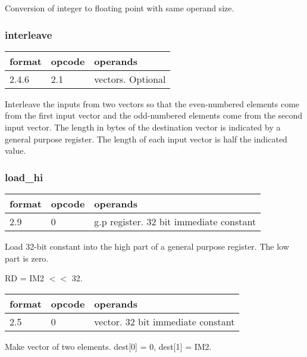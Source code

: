 \documentclass[forwardcom.tex]{subfiles}
\begin{document}
Conversion of integer to floating point with same operand size.

\subsubsection{interleave}
\label{table:interleaveInstruction}
\begin{tabular}{|p{12mm}|p{12mm}|p{110mm}|}
\hline
\bfseries format & \bfseries opcode & \bfseries operands \\ \hline
2.4.6 & 2.1 & vectors. Optional \\ \hline
\end{tabular}
\vspace{2mm}

Interleave the inputs from two vectors so that the even-numbered elements come from the first input vector and the odd-numbered elements come from the second input vector. The length in bytes of the destination vector is indicated by a general purpose register. The length of each input vector is half the indicated value.

\subsubsection{load\_hi}
\label{table:loadHiInstruction}
\begin{tabular}{|p{12mm}|p{12mm}|p{110mm}|}
\hline
\bfseries format & \bfseries opcode & \bfseries operands \\ \hline
2.9 & 0 & g.p register. 32 bit immediate constant \\ \hline
\end{tabular}
\vspace{2mm}

Load 32-bit constant into the high part of a general purpose register. The low part is zero.

RD = IM2 $<<$ 32.
\vspace{4mm}

\begin{tabular}{|p{12mm}|p{12mm}|p{110mm}|}
\hline
\bfseries format & \bfseries opcode & \bfseries operands \\ \hline
2.5 & 0 & vector. 32 bit immediate constant \\ \hline
\end{tabular}
\vspace{2mm}

Make vector of two elements. dest[0] = 0, dest[1] = IM2.
\vspace{2mm}
\end{document}
